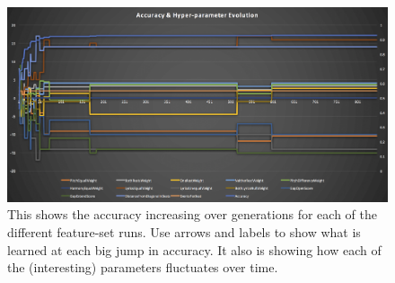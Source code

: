 \documentclass[letterpaper]{article}
\begin{document}
\begin{figure}[th]
    \centering
    \includegraphics[width=\textwidth]{graph}
    \caption{This shows the accuracy increasing over generations for each of the different feature-set runs. Use arrows and labels to show what is learned at each big jump in accuracy. It also is showing how each of the (interesting) parameters fluctuates over time.}
    \label{fig:smallmultiple}
\end{figure}
\end{document}
